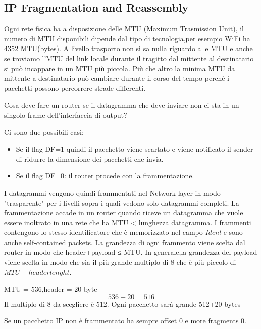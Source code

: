 \subsection{IP Fragmentation and Reassembly}
Ogni rete fisica ha a disposizione delle MTU (Maximum Trasmission Unit), il numero di MTU disponibili dipende dal tipo di tecnologia,per esempio WiFi ha 4352 MTU(bytes). A livello trasporto non si sa nulla riguardo alle MTU e anche se troviamo l'MTU del link locale durante il tragitto dal mittente al destinatario si può incappare in un MTU più piccola. Più che altro la minima MTU da mittente a destinatario può cambiare durante il corso del tempo perchè i pacchetti possono percorrere strade differenti.
\begin{Question}
  Cosa deve fare un router se il datagramma che deve inviare non ci sta in un singolo frame dell'interfaccia di output?
\end{Question}
Ci sono due possibili casi:
\begin{itemize}
  \item Se il flag DF=1 quindi il pacchetto viene scartato e viene notificato il sender di ridurre la dimensione dei pacchetti che invia.
  \item Se il flag DF=0: il router procede con la frammentazione.
\end{itemize}
I datagrammi vengono quindi frammentati nel Network layer in modo "trasparente" per i livelli sopra i quali vedono solo datagrammi completi. La frammentazione accade in un router quando riceve un datagramma che vuole essere inoltrato in una rete che ha MTU < lunghezza datagramma. I frammenti contengono lo stesso identificatore che è memorizzato nel campo \textit{Ident} e sono anche self-contained packets. La grandezza di ogni frammento viene scelta dal router in modo che header+payload ≤ MTU. In generale,la grandezza del payload viene scelta in modo che sia il più grande multiplo di 8 che è più piccolo di $MTU - header lenght$.
\begin{example} MTU = 536,header = 20 byte \\
  \begin{equation}
    536 - 20 = 516
  \end{equation}
  Il multiplo di 8 da scegliere è 512. Ogni pacchetto sarà grande 512+20 bytes
\end{example}
Se un pacchetto IP non è frammentato ha sempre offset 0 e more fragments 0.
